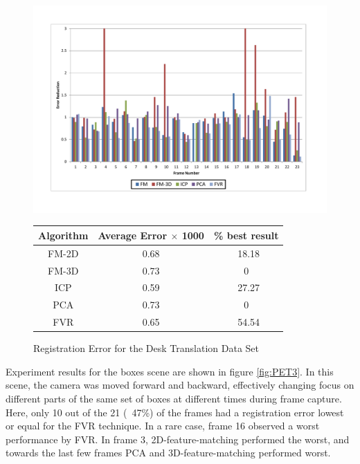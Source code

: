 \begin{figure}
\centering
\includegraphics[width=6in]{images/results/Desk_Texture_Translation}
\caption{Registration Error for the Desk Translation Data Set}
\label{fig:PET4}

\begin{tabular}{ccc}
\hline
\textbf{Algorithm} & \textbf{Average Error $\times$ 1000} & \textbf{\% best result}\\ \hline
FM-2D	& 0.68 & ~18.18\\
FM-3D	& 0.73 & 0\\
ICP		& 0.59 & ~27.27\\
PCA		& 0.73 & 0\\
FVR		& 0.65 & ~54.54\\
\end{tabular}
\label{tab:PET4ST}
\end{figure} 


Experiment results for the boxes scene are shown in figure \ref{fig:PET3}. In this scene, the camera was moved forward and backward, effectively changing focus on different parts of the same set of boxes at different times during frame capture. Here, only 10 out of the 21 (~47\%) of the frames had a registration error lowest or equal for the FVR technique. In a rare case, frame 16 observed a worst performance by FVR. In frame 3, 2D-feature-matching performed the worst, and towards the last few frames PCA and 3D-feature-matching performed worst. \\


